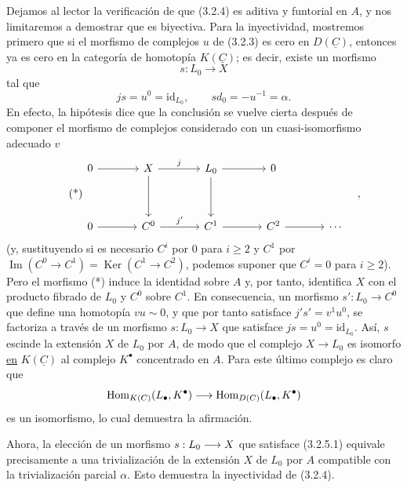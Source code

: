 Dejamos al lector la verificación de que (3.2.4) es aditiva y
funtorial en $A$, y nos limitaremos a demostrar que es biyectiva. Para
la inyectividad, mostremos primero que si el morfismo de complejos $u$
de (3.2.3) es cero en $D(\underline C)$, entonces ya es cero en la
categoría de homotopía $K(\underline C)$; es decir, existe un morfismo
\[
 s:L_0\longrightarrow X
\]
tal que
\begin{equation}\tag{3.2.5.1}
 js=u^0=\mathrm{id}_{L_0},
 \qquad sd_0=-u^{-1}=\alpha.
\end{equation}
En efecto, la hipótesis dice que la conclusión se vuelve cierta
después de componer el morfismo de complejos considerado con un
cuasi-isomorfismo adecuado $v$
\begin{equation}\tag{*}
\begin{tikzcd}[column sep=large,row sep=huge]
 0\arrow[r] & X\arrow[r,"j"]\arrow[d]
 & L_0\arrow[r]\arrow[d] & 0\\
 0\arrow[r] & C^0\arrow[r,"j'"] & C^1\arrow[r] & C^2\arrow[r] & \cdots
\end{tikzcd}\quad ,
\end{equation}
(y, sustituyendo si es necesario $C^i$ por $0$ para $i\geq2$ y
$C^1$ por
$\operatorname{Im}(C^0\longrightarrow C^1)
=\operatorname{Ker}(C^1\longrightarrow C^2)$, podemos suponer que
$C^i=0$ para $i\geq2$). Pero el morfismo (*) induce la identidad sobre
$A$ y, por tanto, identifica $X$ con el producto fibrado de $L_0$ y
$C^0$ sobre $C^1$. En consecuencia, un morfismo
$s':L_0\longrightarrow C^0$ que define una homotopía $vu\sim0$, y que
por tanto satisface $j's'=v^1u^0$, se factoriza a través de un morfismo
$s:L_0\longrightarrow X$ que satisface
$js=u^0=\mathrm{id}_{L_0}$. Así, $s$ escinde la extensión $X$ de
$L_0$ por $A$, de modo que el complejo $X\longrightarrow L_0$ es
isomorfo \underline{en} $K(\underline C)$ al complejo $K^\bullet$
concentrado en $A$. Para este último complejo es claro que
\[
 \Hom_{K(\underline C)}(L_\bullet,K^\bullet)
 \longrightarrow
 \Hom_{D(\underline C)}(L_\bullet,K^\bullet)
\]
es un isomorfismo, lo cual demuestra la afirmación.

Ahora, la elección de un morfismo
$\sisi{j}{s}:L_0\longrightarrow X$ que satisface (3.2.5.1) equivale
precisamente a una trivialización de la extensión $X$ de $L_0$ por
$A$ compatible con la trivialización parcial $\alpha$. Esto demuestra
la inyectividad de (3.2.4).

